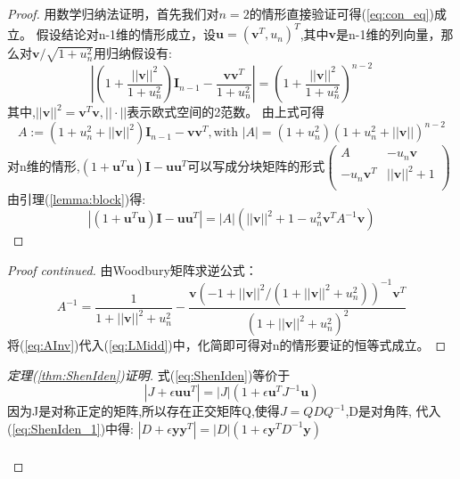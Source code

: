 \documentclass[notheorems,xetex,mathserif,serif]{beamer}
\begin{document}
\begin{frame}
\begin{proof}
用数学归纳法证明，首先我们对$n=2$的情形直接验证可得(\ref{eq:con_eq})成立。
假设结论对n-1维的情形成立，设$\bm{u}=(\bm{v}^T,u_n)^T$,其中$\bm{v}$是n-1维的列向量，那么对$\bm{v}/\sqrt{1+u_n^2}$用归纳假设有:
\begin{equation}
|(1+\frac{||\bm{v}||^2}{1+u_n^2})\bm{I}_{n-1}-\frac{\bm{v}\bm{v}^T}{1+u_n^2}|=(1+\frac{||\bm{v}||^2}{1+u_n^2})^{n-2}
\end{equation}
其中,$||\bm{v}||^2=\bm{v}^T\bm{v},||\cdot||$表示欧式空间的2范数。
由上式可得
\begin{equation}
A:=(1+u_n^2+||\bm{v}||^2)\bm{I}_{n-1}-\bm{v}\bm{v}^T,\text{with }|A|=(1+u_n^2)(1+u_n^2+||\bm{v}||)^{n-2}
\end{equation}
对n维的情形,$(1+\bm{u}^T\bm{u})\bm{I}-\bm{u}\bm{u}^T$可以写成分块矩阵的形式$\left(\begin{array}{cc}
A&-u_n\bm{v}\\
-u_n\bm{v}^T&||\bm{v}||^2+1\\
\end{array}\right)$
由引理(\ref{lemma:block})得:
\begin{equation}\label{eq:LMidd}
|(1+\bm{u}^T\bm{u})\bm{I}-\bm{u}\bm{u}^T|=|A|(||\bm{v}||^2+1-u_n^2 \bm{v}^TA^{-1}\bm{v})
\end{equation}
\end{proof}
\end{frame}
\begin{frame}
\begin{proof}[Proof continued]
由Woodbury矩阵求逆公式：
\begin{equation}\label{eq:AInv}
A^{-1}=\frac{1}{1+||\bm{v}||^2+u_n^2}-\frac{\bm{v}(-1+||\bm{v}||^2/(1+||\bm{v}||^2+u_n^2))^{-1}\bm{v}^T}{(1+||\bm{v}||^2+u_n^2)^2}
\end{equation}
将(\ref{eq:AInv})代入(\ref{eq:LMidd})中，化简即可得对n的情形要证的恒等式成立。
\end{proof}
\begin{proof}[定理(\ref{thm:ShenIden})证明]
式(\ref{eq:ShenIden})等价于
\begin{equation}\label{eq:ShenIden_1}
|J+\epsilon \bm{u}\bm{u}^T|=|J|(1+\epsilon \bm{u}^TJ^{-1}\bm{u})
\end{equation}
因为J是对称正定的矩阵,所以存在正交矩阵Q,使得$J=QDQ^{-1}$,D是对角阵,
代入(\ref{eq:ShenIden_1})中得:
$|D+\epsilon \bm{y}\bm{y}^T|=|D|(1+\epsilon \bm{y}^TD^{-1}\bm{y})$
\\
\qquad\\
\end{proof}
\end{frame}
\end{document}
